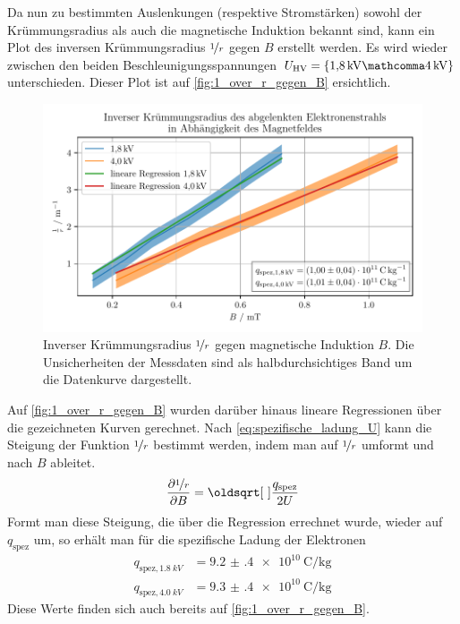 \documentclass[ngerman]{scrartcl}
\begin{document}
%
Da nun zu bestimmten Auslenkungen (respektive Stromstärken) sowohl der Krümmungsradius als auch die magnetische Induktion bekannt sind, kann ein Plot des inversen Krümmungsradius $\nicefrac{1}{r}$ gegen $B$ erstellt werden. Es wird wieder zwischen den beiden Beschleunigungsspannungen $U_{\text{HV}}=\{\SI{1.8}{kV}\mathcomma\SI{4}{kV}\}$ unterschieden. Dieser Plot ist auf \autoref{fig:1_over_r_gegen_B} ersichtlich.
%
\begin{figure}[H]
    \centering
    \begin{samepage}
        \includegraphics[width=\linewidth]{../python/plots/kruemmungsradius.pdf}
        \caption[Inverser Krümmungsradius gegen $B$-Feld]{Inverser Krümmungsradius $\nicefrac{1}{r}$ gegen magnetische Induktion $B$. Die Unsicherheiten der Messdaten sind als halbdurchsichtiges Band um die Datenkurve dargestellt.}
        \label{fig:1_over_r_gegen_B}
    \end{samepage}
\end{figure}
%
Auf \autoref{fig:1_over_r_gegen_B} wurden darüber hinaus lineare Regressionen über die gezeichneten Kurven gerechnet. Nach \autoref{eq:spezifische_ladung_U} kann die Steigung der Funktion $\nicefrac{1}{r}$ bestimmt werden, indem man auf $\nicefrac{1}{r}$ umformt und nach $B$ ableitet.
\[\pdv{\nicefrac{1}{r}}{B} = \sqrt{\frac{q_{\text{spez}}}{2U}}\]
Formt man diese Steigung, die über die Regression errechnet wurde, wieder auf $q_{\text{spez}}$ um, so erhält man für die spezifische Ladung der Elektronen
\begin{align*}
    q_{\text{spez},\SI{1.8}{kV}} & = \SI{9.2(4)e10}{\coulomb\per\kilo\gram} \\
    q_{\text{spez},\SI{4.0}{kV}} & = \SI{9.3(4)e10}{\coulomb\per\kilo\gram}
\end{align*}
Diese Werte finden sich auch bereits auf \autoref{fig:1_over_r_gegen_B}.
\end{document}
